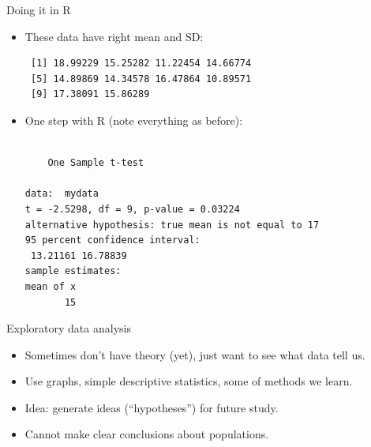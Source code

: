 \begin{frame}[fragile]{Doing it in R}
  


\begin{itemize}
\item These data have right mean and SD:
\begin{knitrout}
\color{fgcolor}\begin{kframe}
\begin{alltt}
\end{alltt}
\begin{verbatim}
 [1] 18.99229 15.25282 11.22454 14.66774
 [5] 14.89869 14.34578 16.47864 10.89571
 [9] 17.38091 15.86289
\end{verbatim}
\end{kframe}
\end{knitrout}
\item One step with R (note everything as before):
  {\small
\begin{knitrout}
\color{fgcolor}\begin{kframe}
\begin{alltt}
\hlstd{=}\hlstd{)}
\end{alltt}
\begin{verbatim}

	One Sample t-test

data:  mydata
t = -2.5298, df = 9, p-value = 0.03224
alternative hypothesis: true mean is not equal to 17
95 percent confidence interval:
 13.21161 16.78839
sample estimates:
mean of x 
       15 
\end{verbatim}
\end{kframe}
\end{knitrout}
}
\end{itemize}
  
\end{frame}

\begin{frame}{Exploratory data analysis}
  \begin{itemize}
  \item Sometimes don't have theory (yet), just want to see what data
    tell us.
  \item Use graphs, simple descriptive statistics, some of methods we learn.
  \item Idea: generate ideas (``hypotheses'') for future study.
  \item Cannot make clear conclusions about populations.
  \end{itemize}
\end{frame}


